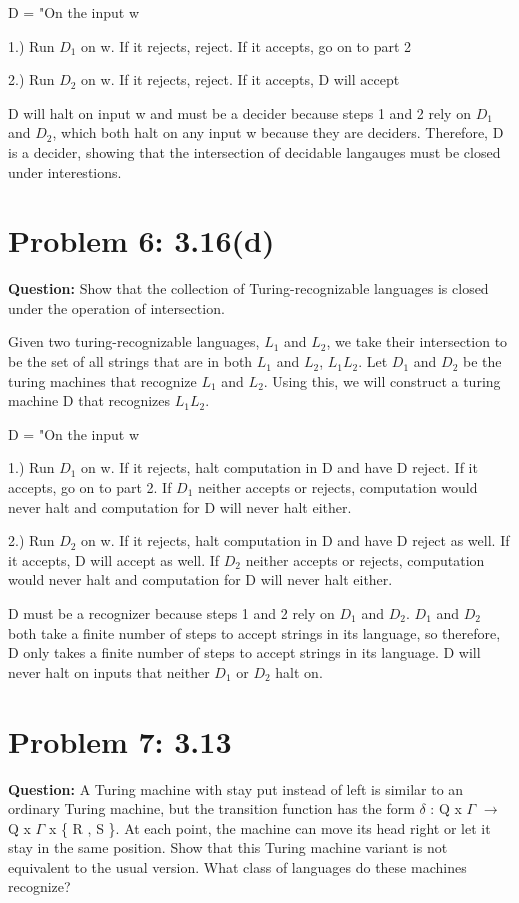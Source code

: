 \documentclass[12pt]{article}
\begin{document}
D = "On the input w

1.) Run $D_1$ on w. If it rejects, reject. If it accepts, go on to part 2

2.) Run $D_2$ on w. If it rejects, reject. If it accepts, D will accept

D will halt on input w and must be a decider because steps 1 and 2 rely on $D_1$ and $D_2$, which both halt on any input w because they are deciders. Therefore, D is a decider, showing that the intersection of decidable langauges must be closed under interestions.

\section*{Problem 6: 3.16(d)}
{\bfseries Question:} Show that the collection of Turing-recognizable languages is closed under the operation of intersection.

Given two turing-recognizable languages, $L_1$ and $L_2$, we take their intersection to be the set of all strings that are in both $L_1$ and $L_2$, $L_1$\cap$L_2$. Let $D_1$ and $D_2$ be the turing machines that recognize $L_1$ and $L_2$. Using this, we will construct a turing machine D that recognizes $L_1$\cap$L_2$.

D = "On the input w

1.) Run $D_1$ on w. If it rejects, halt computation in D and have D reject. If it accepts, go on to part 2. If $D_1$ neither accepts or rejects, computation would never halt and computation for D will never halt either.

2.) Run $D_2$ on w. If it rejects, halt computation in D and have D reject as well. If it accepts, D will accept as well. If $D_2$ neither accepts or rejects, computation would never halt and computation for D will never halt either.

D must be a recognizer because steps 1 and 2 rely on $D_1$ and $D_2$. $D_1$ and $D_2$ both take a finite number of steps to accept strings in its language, so therefore, D only takes a finite number of steps to accept strings in its language. D will never halt on inputs that neither $D_1$ or $D_2$ halt on.

\section*{Problem 7: 3.13}
{\bfseries Question:} A Turing machine with stay put instead of left is similar to an ordinary Turing machine, but the transition function has the form $\delta$ : Q x $\Gamma$ $\xrightarrow{}$ Q x $\Gamma$ x \{ R , S \}. At each point, the machine can move its head right or let it stay in the same position. Show that this Turing machine variant is not equivalent to the usual version. What class of languages do these machines recognize?
\end{document}

